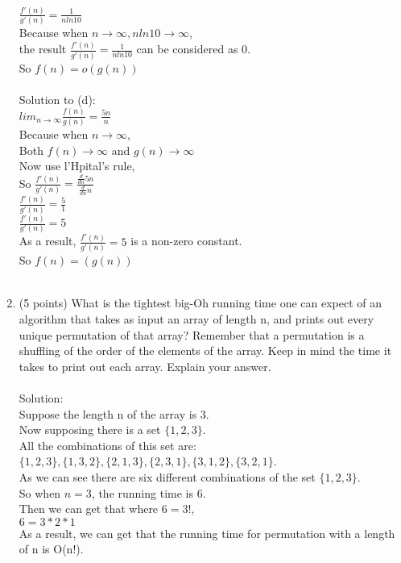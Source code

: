 \documentclass[12pt]{article}
\begin{document}
\begin{enumerate}
\\ $\frac{f'(n)}{g'(n)} = \frac{1}{nln10}$
\\Because when $n\rightarrow\infty, nln10\rightarrow\infty$,
\\the result $\frac{f'(n)}{g'(n)} =\frac{1}{nln10}$ can be considered as 0.
\\So $f(n) = o(g(n))$
\\\\Solution to (d):
\\$lim_{n\rightarrow\infty} \frac{f(n)}{g(n)} = \frac{5n}{n}$
\\Because when $n\rightarrow \infty$,
\\Both $f(n) \rightarrow \infty$ and $g(n)\rightarrow \infty$
\\Now use l'Hpital's rule,
\\So $\frac{f'(n)}{g'(n)} = \frac{\frac{d}{dn}5n}{ \frac{d}{dn}n}$
\\$\frac{f'(n)}{g'(n)} = \frac{5}{1}$
\\$\frac{f'(n)}{g'(n)} = 5$
\\As a result, $\frac{f'(n)}{g'(n)} = 5$ is a non-zero constant.
\\So $f(n) = (g(n))$
\\\\


\item (5 points) What is the tightest big-Oh running time one can expect of an algorithm that takes as input an array of length n, and prints out every unique permutation of that array? Remember that a permutation is a shuffling of the order of the elements of the array. Keep in mind the time it takes to print out each array. Explain your answer. 
\\\\Solution:
\\Suppose the length n of the array is 3.
\\Now supposing there is a set $\{1,2,3\}$.
\\All the combinations of this set are: $\{1,2,3\}, \{1,3,2\}, \{2,1,3\}, \{2,3,1\}, \{3,1,2\}, \{3,2,1\}$.
\\As we can see there are six different combinations of the set $\{1,2,3\}$.
\\So when $n = 3$, the running time is 6.
\\Then we can get that where $6 = 3!$,
\\$6 = 3 * 2 *1$
\\As a result, we can get that the running time for permutation with a length of n is O(n!).
\\\\


\end{enumerate}
\end{document}
